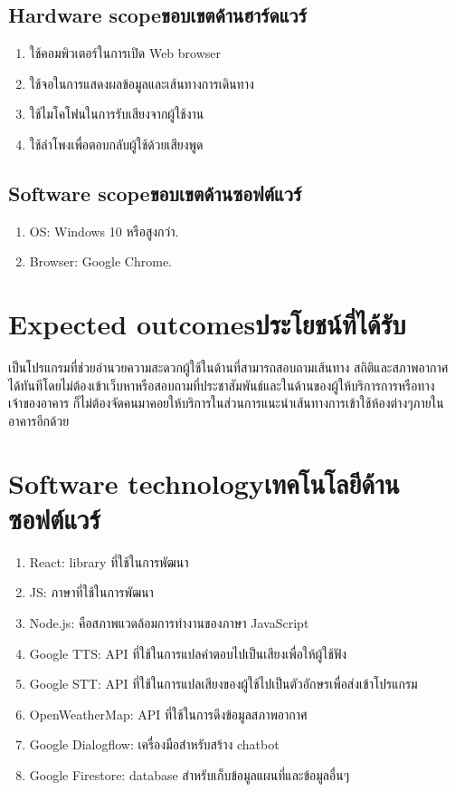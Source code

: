 \subsection{\ifenglish Hardware scope\else ขอบเขตด้านฮาร์ดแวร์\fi}
\begin{enumerate}
    \item ใช้คอมพิวเตอร์ในการเปิด Web browser
    \item ใช้จอในการแสดงผลข้อมูลและเส้นทางการเดินทาง
    \item ใช้ไมโคโฟนในการรับเสียงจากผู้ใช้งาน
    \item ใช้ลำโพงเพื่อตอบกลับผู้ใช้ด้วยเสียงพูด
\end{enumerate}

\subsection{\ifenglish Software scope\else ขอบเขตด้านซอฟต์แวร์\fi}
\begin{enumerate}
    \item OS: Windows 10 หรือสูงกว่า.
    \item Browser: Google Chrome.
\end{enumerate}

\section{\ifenglish Expected outcomes\else ประโยชน์ที่ได้รับ\fi}
เป็นโปรแกรมที่ช่วยอำนวยความสะดวกผู้ใช้ในด้านที่สามารถสอบถามเส้นทาง สถิติและสภาพอากาศ 
ได้ทันทีโดยไม่ต้องเข้าเว็บหาหรือสอบถามที่ประชาสัมพันธ์และในด้านของผู้ให้บริการการหรือทางเจ้าของอาคาร
ก็ไม่ต้องจัดคนมาคอยให้บริการในส่วนการแนะนำเส้นทางการเข้าใช้ห้องต่างๆภายในอาคารอีกด้วย

\section{\ifenglish Software technology\else เทคโนโลยีด้านซอฟต์แวร์\fi}
\begin{enumerate}
    \item React: library ที่ใช้ในการพัฒนา
    \item JS: ภาษาที่ใช้ในการพัฒนา
    \item Node.js: คือสภาพแวดล้อมการทำงานของภาษา JavaScript
    \item Google TTS: API ที่ใช้ในการแปลคำตอบไปเป็นเสียงเพื่อให้ผู้ใช้ฟัง
    \item Google STT: API ที่ใช้ในการแปลเสียงของผู้ใช้ไปเป็นตัวอักษรเพื่อส่งเข้าโปรแกรม
    \item OpenWeatherMap: API ที่ใช้ในการดึงข้อมูลสภาพอากาศ
    \item Google Dialogflow: เครื่องมือสำหรับสร้าง chatbot
    \item Google Firestore: database สำหรับเก็บข้อมูลแผนที่และข้อมูลอื่นๆ
\end{enumerate}

